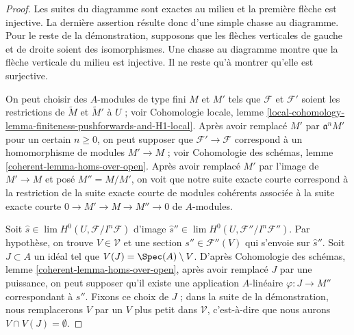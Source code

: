\begin{proof}
Les suites du diagramme sont exactes au milieu et la première
flèche est injective. La dernière assertion résulte donc d'une simple
chasse au diagramme. Pour le reste de la démonstration, supposons que les flèches verticales
de gauche et de droite soient des isomorphismes. Une chasse au diagramme montre
que la flèche verticale du milieu est injective. Il ne reste
qu'à montrer qu'elle est surjective.

\medskip\noindent
On peut choisir des $A$-modules de type fini $M$ et $M'$ tels que $\mathcal{F}$
et $\mathcal{F}'$ soient les restrictions
de $\widetilde{M}$ et $\widetilde{M}'$ à $U$ ; voir Cohomologie locale, lemme
\ref{local-cohomology-lemma-finiteness-pushforwards-and-H1-local}.
Après avoir remplacé $M'$ par $\mathfrak a^n M'$ pour un certain $n \geq 0$,
on peut supposer que $\mathcal{F}' \to \mathcal{F}$
correspond à un homomorphisme de modules $M' \to M$ ; voir
Cohomologie des schémas, lemme \ref{coherent-lemma-homs-over-open}.
Après avoir remplacé $M'$ par l'image de $M' \to M$
et posé $M'' = M/M'$, on voit que notre suite exacte courte
correspond à la restriction de la suite exacte courte de
modules cohérents associée à la suite exacte courte
$0 \to M' \to M \to M'' \to 0$ de $A$-modules.

\medskip\noindent
Soit $\hat s \in \lim H^0(U, \mathcal{F}/I^n\mathcal{F})$
d'image $\hat s'' \in \lim H^0(U, \mathcal{F}''/I^n\mathcal{F}'')$.
Par hypothèse, on trouve $V \in \mathcal{V}$
et une section $s'' \in \mathcal{F}''(V)$ qui s'envoie sur $\hat s''$.
Soit $J \subset A$ un idéal tel que $V(J) = \Spec(A) \setminus V$.
D'après Cohomologie des schémas, lemme \ref{coherent-lemma-homs-over-open},
après avoir remplacé $J$ par une puissance, on peut supposer
qu'il existe une application $A$-linéaire $\varphi : J \to M''$
correspondant à $s''$. Fixons ce choix de $J$ ; dans la suite
de la démonstration, nous remplacerons $V$ par un $V$ plus petit dans $\mathcal{V}$,
c'est-à-dire que nous aurons $V \cap V(J) = \emptyset$.


\end{proof}
